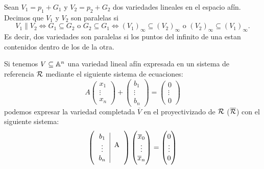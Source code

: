 \begin{obs}
Sean $V_1 = p_1 + G_1$ y $V_2 = p_2 + G_2$ dos variedades lineales en el espacio afín.
Decimos que $V_1$ y $V_2$ son paralelas si
\[
  V_1 \parallel V_2 \iff G_1 \subseteq G_2 \text{ o } G_2 \subseteq G_1 \iff
  (V_1)_\infty \subseteq (V_2)_\infty \text{ o } (V_2)_\infty \subseteq (V_1)_\infty.
\]
Es decir, dos variedades son paralelas si los puntos del infinito de una estan 
contenidos dentro de los de la otra.
\end{obs}

\begin{prop}
 Si tenemos $V \subseteq \mathbb{A}^n$ una variedad lineal afín expresada en un sistema
 de referencia $\mathcal{R}$ mediante el siguiente sistema de ecuaciones:
 \[
   A 
   \begin{pmatrix} x_1 \\ \vdots \\ x_n \end{pmatrix} 
   + 
   \begin{pmatrix}
     b_1 \\ \vdots \\ b_n
   \end{pmatrix}
   =
   \begin{pmatrix}
     0 \\ \vdots \\ 0
   \end{pmatrix}
 \]
 podemos expresar la variedad completada $\overline{V}$ en
 el proyectivizado de $\mathcal{R}$ ($\overline{\mathcal{R}}$) con el siguiente sistema:
  \[
   \lp
   \begin{tabular}{c|c} $b_1$ & \multirow{3}{*}{A} \\ $\vdots$ & \\ $b_n$ & \end{tabular} 
   \rp 
   \begin{pmatrix}
     \overline{x}_0 \\ \vdots \\ \overline{x}_n 
   \end{pmatrix}
   =
   \begin{pmatrix}
     0 \\ \vdots \\ 0
   \end{pmatrix}
 \]
 \end{prop}

